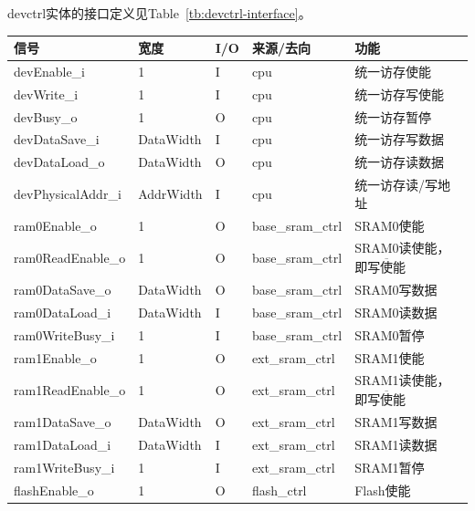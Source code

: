 \documentclass{article}
\begin{document}
\begin{spacing}{1.4}
devctrl实体的接口定义见Table~\ref{tb:devctrl-interface}。
\begin{longtable}{l|l|l|l|p{5cm}}
\hline
\textbf{信号}&\textbf{宽度}&\textbf{I/O}&\textbf{来源/去向}&\textbf{功能} \\
\hline \endhead devEnable\_i   & 1                      & I     & cpu               & 统一访存使能 \\
\hline devWrite\_i             & 1                      & I     & cpu               & 统一访存写使能 \\
\hline devBusy\_o              & 1                      & O     & cpu               & 统一访存暂停 \\
\hline devDataSave\_i          & DataWidth              & I     & cpu               & 统一访存写数据 \\
\hline devDataLoad\_o          & DataWidth              & O     & cpu               & 统一访存读数据 \\
\hline devPhysicalAddr\_i      & AddrWidth              & I     & cpu               & 统一访存读/写地址 \\
\hline ram0Enable\_o           & 1                      & O     & base\_sram\_ctrl  & SRAM0使能 \\
\hline ram0ReadEnable\_o       & 1                      & O     & base\_sram\_ctrl  & SRAM0读使能，即$\overline{\text{写使能}}$ \\
\hline ram0DataSave\_o         & DataWidth              & O     & base\_sram\_ctrl  & SRAM0写数据 \\
\hline ram0DataLoad\_i         & DataWidth              & I     & base\_sram\_ctrl  & SRAM0读数据 \\
\hline ram0WriteBusy\_i        & 1                      & I     & base\_sram\_ctrl  & SRAM0暂停 \\
\hline ram1Enable\_o           & 1                      & O     & ext\_sram\_ctrl   & SRAM1使能 \\
\hline ram1ReadEnable\_o       & 1                      & O     & ext\_sram\_ctrl   & SRAM1读使能，即$\overline{\text{写使能}}$ \\
\hline ram1DataSave\_o         & DataWidth              & O     & ext\_sram\_ctrl   & SRAM1写数据 \\
\hline ram1DataLoad\_i         & DataWidth              & I     & ext\_sram\_ctrl   & SRAM1读数据 \\
\hline ram1WriteBusy\_i        & 1                      & I     & ext\_sram\_ctrl   & SRAM1暂停 \\
\hline flashEnable\_o          & 1                      & O     & flash\_ctrl       & Flash使能 \\

\end{longtable}
\end{spacing}
\end{document}
